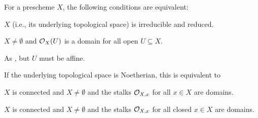 \documentclass[a4paper,parskip=half,numbers=enddot, DIV=12]{scrreprt}
\begin{document}
\begin{prop}
    For a prescheme $X$, the following conditions are equivalent:
    \begin{alphanumerate}
    \item 
        $X$ (i.e., its underlying topological space) is irreducible and reduced.
    \item 
        $X\neq \emptyset$ and $\mathcal{O}_X(U)$ is a domain for all open $U\subseteq X$.
    \item 
        As , but $U$ must be affine.
    \end{alphanumerate}
    If the underlying topological space is Noetherian, this is equivalent to 
    \begin{alphanumerate}
    \item[\itememph{d}]
        $X$ is connected and $X\neq \emptyset$ and the stalks $\mathcal{O}_{X,x}$ for all $x\in X$ are domains.
    \item[\itememph{e}]
        $X$ is connected and $X\neq \emptyset$ and the stalks $\mathcal{O}_{X,x}$ for all closed $x\in X$ are domains.
    \end{alphanumerate}
\end{prop}
\end{document}
